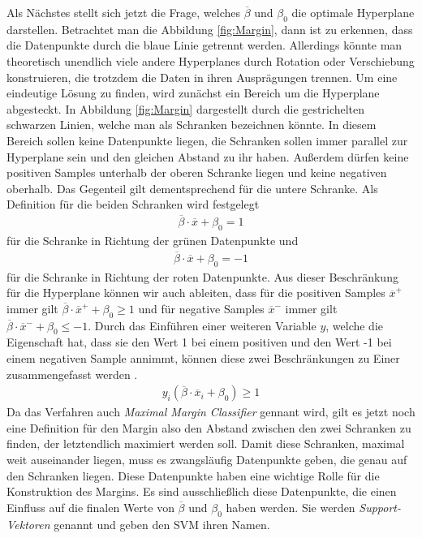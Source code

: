 \documentclass[
]{article}
\begin{document}
Als Nächstes stellt sich jetzt die Frage, welches \(\overline{\beta}\)
und \(\beta_0\) die optimale Hyperplane darstellen. Betrachtet man die
Abbildung \ref{fig:Margin}, dann ist zu erkennen, dass die Datenpunkte
durch die blaue Linie getrennt werden. Allerdings könnte man theoretisch
unendlich viele andere Hyperplanes durch Rotation oder Verschiebung
konstruieren, die trotzdem die Daten in ihren Ausprägungen trennen. Um
eine eindeutige Lösung zu finden, wird zunächst ein Bereich um die
Hyperplane abgesteckt. In Abbildung \ref{fig:Margin} dargestellt durch
die gestrichelten schwarzen Linien, welche man als Schranken bezeichnen
könnte. In diesem Bereich sollen keine Datenpunkte liegen, die Schranken
sollen immer parallel zur Hyperplane sein und den gleichen Abstand zu
ihr haben. Außerdem dürfen keine positiven Samples unterhalb der oberen
Schranke liegen und keine negativen oberhalb. Das Gegenteil gilt
dementsprechend für die untere Schranke. Als Definition für die beiden
Schranken wird festgelegt \begin{align}
\overline{\beta}\cdot \overline{x}+\beta_0=1\label{eq:posSV}
\end{align} für die Schranke in Richtung der grünen Datenpunkte und
\begin{align}
\overline{\beta}\cdot \overline{x}+\beta_0=-1\label{eq:negSV}
\end{align} für die Schranke in Richtung der roten Datenpunkte. Aus
dieser Beschränkung für die Hyperplane können wir auch ableiten, dass
für die positiven Samples \(\overline{x}^+\) immer gilt
\(\overline{\beta}\cdot \overline{x}^++\beta_0\ge 1\) und für negative
Samples \(\overline{x}^-\) immer gilt
\(\overline{\beta}\cdot \overline{x}^-+\beta_0\le -1\). Durch das
Einführen einer weiteren Variable \(y\), welche die Eigenschaft hat,
dass sie den Wert 1 bei einem positiven und den Wert -1 bei einem
negativen Sample annimmt, können diese zwei Beschränkungen zu Einer
zusammengefasst werden \parencite{cortesSupportvectorNetworks1995}.
\begin{align}
y_i(\overline{\beta}\cdot \overline{x}_i+\beta_0)\ge 1\label{eq:Nebenbedingung}
\end{align} Da das Verfahren auch \textit{Maximal Margin Classifier}
gennant wird, gilt es jetzt noch eine Definition für den Margin also den
Abstand zwischen den zwei Schranken zu finden, der letztendlich
maximiert werden soll. Damit diese Schranken, maximal weit auseinander
liegen, muss es zwangsläufig Datenpunkte geben, die genau auf den
Schranken liegen. Diese Datenpunkte haben eine wichtige Rolle für die
Konstruktion des Margins. Es sind ausschließlich diese Datenpunkte, die
einen Einfluss auf die finalen Werte von \(\overline{\beta}\) und
\(\beta_0\) haben werden. Sie werden \textit{Support-Vektoren} genannt
und geben den SVM ihren Namen.
\end{document}
